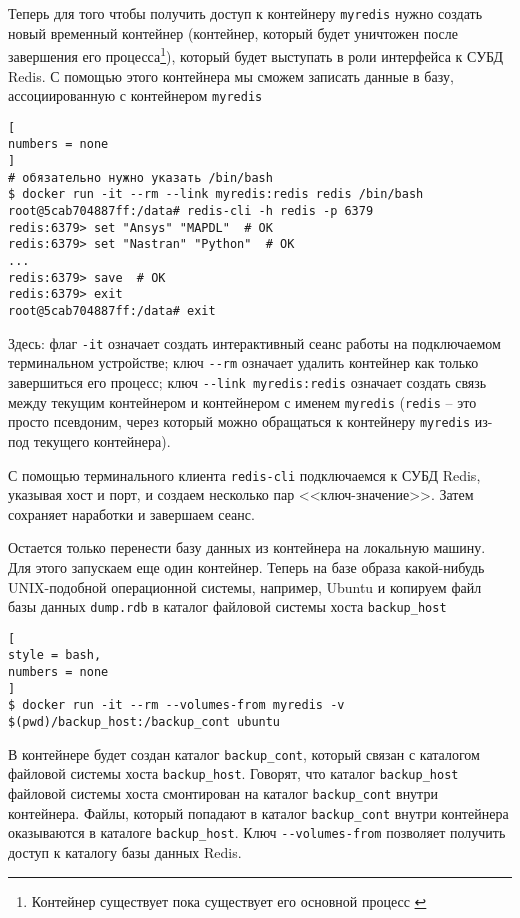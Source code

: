 \documentclass[%
	11pt,
	a4paper,
	utf8,
		]{article}
\begin{document}
Теперь для того чтобы получить доступ к контейнеру \texttt{myredis} нужно создать новый временный контейнер (контейнер, который будет уничтожен после завершения его процесса\footnote{Контейнер существует пока существует его основной процесс \cite{mouat:docker-2017}}), который будет выступать в роли интерфейса к СУБД Redis. С помощью этого контейнера мы сможем записать данные в базу, ассоциированную с контейнером \texttt{myredis}
\begin{lstlisting}[
numbers = none
]
# обязательно нужно указать /bin/bash
$ docker run -it --rm --link myredis:redis redis /bin/bash
root@5cab704887ff:/data# redis-cli -h redis -p 6379
redis:6379> set "Ansys" "MAPDL"  # OK
redis:6379> set "Nastran" "Python"  # OK
...
redis:6379> save  # OK
redis:6379> exit
root@5cab704887ff:/data# exit
\end{lstlisting}

Здесь: флаг \verb|-it| означает создать интерактивный сеанс работы на подключаемом терминальном устройстве; ключ \verb|--rm| означает удалить контейнер как только завершиться его процесс; ключ \verb|--link myredis:redis| означает создать связь между текущим контейнером и контейнером с именем \texttt{myredis} (\texttt{redis} -- это просто псевдоним, через который можно обращаться к контейнеру \texttt{myredis} из-под текущего контейнера).

С помощью терминального клиента \texttt{redis-cli} подключаемся к СУБД Redis, указывая хост и порт, и создаем несколько пар <<ключ-значение>>. Затем сохраняет наработки и завершаем сеанс.

Остается только перенести базу данных из контейнера на локальную машину. Для этого запускаем еще один контейнер. Теперь на базе образа какой-нибудь UNIX-подобной операционной системы, например, Ubuntu и копируем файл базы данных \texttt{dump.rdb} в каталог файловой системы хоста \texttt{backup\_host}
\begin{lstlisting}[
style = bash,
numbers = none
]
$ docker run -it --rm --volumes-from myredis -v $(pwd)/backup_host:/backup_cont ubuntu
\end{lstlisting}

В контейнере будет создан каталог \texttt{backup\_cont}, который связан с каталогом файловой системы хоста \texttt{backup\_host}. Говорят, что каталог \texttt{backup\_host} файловой системы хоста смонтирован на каталог \texttt{backup\_cont} внутри контейнера. Файлы, который попадают в каталог \texttt{backup\_cont} внутри контейнера оказываются в каталоге \texttt{backup\_host}. Ключ \verb|--volumes-from| позволяет получить доступ к каталогу базы данных Redis.
\end{document}

